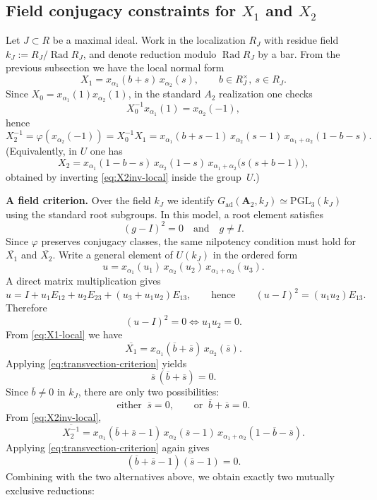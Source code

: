 \documentclass[]{jgcc}
\DeclareMathOperator{\Rad}{Rad}
\numberwithin{equation}{section}
\begin{document}
\subsection{\texorpdfstring{Field conjugacy constraints for $X_1$ and $X_2$}{Field conjugacy constraints for X1 and X2}}\label{subsec:field-conjugacy}

Let $J\subset R$ be a maximal ideal. Work in the localization $R_J$ with residue field
$k_J:=R_J/\Rad R_J$, and denote reduction modulo $\Rad R_J$ by a bar.
From the previous subsection we have the local normal form
\begin{equation}\label{eq:X1-local}
X_1 = x_{\alpha_1}(b+s)\,x_{\alpha_2}(s),
\qquad b\in R_J^\times,\ s\in R_J.
\end{equation}
Since $X_0=x_{\alpha_1}(1)x_{\alpha_2}(1)$, in the standard $A_2$ realization one checks
\[
X_0^{-1}x_{\alpha_1}(1)=x_{\alpha_2}(-1),
\]
hence
\begin{equation}\label{eq:X2inv-local}
X_2^{-1}=\varphi(x_{\alpha_2}(-1))=X_0^{-1}X_1
= x_{\alpha_1}(b+s-1)\,x_{\alpha_2}(s-1)\,x_{\alpha_1+\alpha_2}(1-b-s).
\end{equation}
(Equivalently, in $U$ one has
\begin{equation}\label{eq:X2-local}
X_2
= x_{\alpha_1}(1-b-s)\,x_{\alpha_2}(1-s)\,x_{\alpha_1+\alpha_2}\bigl(s(s+b-1)\bigr),
\end{equation}
obtained by inverting \eqref{eq:X2inv-local} inside the group~$U$.)

\medskip
\noindent\textbf{A field criterion.}
Over the field $k_J$ we identify $G_{\mathrm{ad}}(\mathbf A_2,k_J)\simeq \mathrm{PGL}_3(k_J)$ using the
standard root subgroups. In this model,
a root element satisfies
\[
(g-I)^2=0\quad\text{and}\quad g\neq I.
\]
Since $\varphi$ preserves conjugacy classes, the same nilpotency condition must hold for
$\overline{X_1}$ and $\overline{X_2}$.
Write a general element of $U(k_J)$ in the ordered form
\[
u=x_{\alpha_1}(u_1)\,x_{\alpha_2}(u_2)\,x_{\alpha_1+\alpha_2}(u_3).
\]
A direct matrix multiplication gives
\[
u = I + u_1E_{12}+u_2E_{23}+(u_3+u_1u_2)E_{13},
\qquad\text{hence}\qquad
(u-I)^2 = (u_1u_2)E_{13}.
\]
Therefore
\begin{equation}\label{eq:transvection-criterion}
(u-I)^2=0 \iff u_1u_2=0.
\end{equation}
From \eqref{eq:X1-local} we have
\[
\overline{X_1}=x_{\alpha_1}(\overline{b}+\overline{s})\,x_{\alpha_2}(\overline{s}).
\]
Applying \eqref{eq:transvection-criterion} yields
\[
\overline{s}\,(\overline{b}+\overline{s})=0.
\]
Since $\overline{b}\neq 0$ in $k_J$, there are only two possibilities:
\[
\text{either }\ \overline{s}=0,\qquad
\text{or }\ \overline{b}+\overline{s}=0.
\]
From \eqref{eq:X2inv-local},
\[
\overline{X_2^{-1}}
= x_{\alpha_1}(\overline{b}+\overline{s}-1)\,x_{\alpha_2}(\overline{s}-1)\,
  x_{\alpha_1+\alpha_2}(1-\overline{b}-\overline{s}).
\]
Applying \eqref{eq:transvection-criterion} again gives
\[
(\overline{b}+\overline{s}-1)(\overline{s}-1)=0.
\]
Combining with the two alternatives above, we obtain exactly two mutually exclusive reductions:
\end{document}
